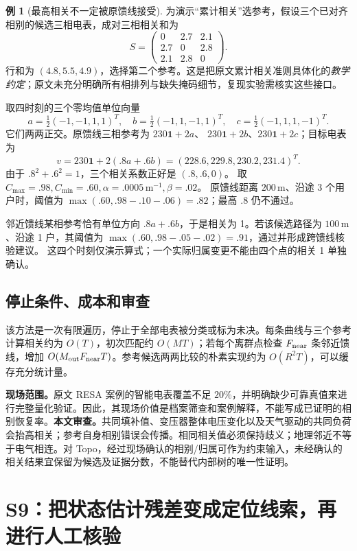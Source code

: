 \documentclass[UTF8,11pt,fontset=fandol,openany,oneside]{ctexbook}
\theoremstyle{definition}
\newtheorem{example}[theorem]{例}
\theoremstyle{remark}
\numberwithin{equation}{chapter}
\begin{document}
\begin{example}[最高相关不一定被原馈线接受]
为演示“累计相关”选参考，假设三个已对齐相别的候选三相电表，成对三相相关和为
\[
 S=\begin{pmatrix}0&2.7&2.1\\2.7&0&2.8\\2.1&2.8&0\end{pmatrix}.
\]
行和为 $(4.8,5.5,4.9)$，选择第二个参考。这是把原文累计相关准则具体化的\emph{教学约定}；原文未充分明确所有相排列与缺失掩码细节，复现实验需核实这些接口。

取四时刻的三个零均值单位向量
\[
 a=\tfrac12(-1,-1,1,1)^T,\quad
 b=\tfrac12(-1,1,-1,1)^T,\quad
 c=\tfrac12(-1,1,1,-1)^T.
\]
它们两两正交。原馈线三相参考为 $230\boldsymbol1+2a$、
$230\boldsymbol1+2b$、$230\boldsymbol1+2c$；目标电表为
\[
 v=230\boldsymbol1+2(.8a+.6b)=(228.6,229.8,230.2,231.4)^T.
\]
由于 $.8^2+.6^2=1$，三个相关系数正好是 $(.8,.6,0)$。
取 $C_{\max}=.98,C_{\min}=.60,\alpha=.0005\,\mathrm{m}^{-1},\beta=.02$。
原馈线距离 $200\,\mathrm m$、沿途 3 个用户时，阈值为
$\max(.60,.98-.10-.06)=.82$；最高 $.8$ 仍不通过。

邻近馈线某相参考恰有单位方向 $.8a+.6b$，于是相关为 1。若该候选路径为 $100\,\mathrm m$、沿途 1 户，其阈值为
$\max(.60,.98-.05-.02)=.91$，通过并形成跨馈线核验建议。
这四个时刻仅演示算式；一个实际归属变更不能由四个点的相关 1 单独确认。
\end{example}

\subsection{停止条件、成本和审查}

该方法是一次有限遍历，停止于全部电表被分类或标为未决。每条曲线与三个参考计算相关约为 $O(T)$，初次匹配约 $O(MT)$；若每个离群点检查 $F_{\rm near}$ 条邻近馈线，增加 $O(M_{\rm out}F_{\rm near}T)$。参考候选两两比较的朴素实现约为 $O(R^2T)$，可以缓存充分统计量。

\textbf{现场范围。}原文 RESA 案例的智能电表覆盖不足 $20\%$，并明确缺少可靠真值来进行完整量化验证。因此，其现场价值是档案筛查和案例解释，不能写成已证明的相别恢复率。\textbf{本文审查。}共同填补值、变压器整体电压变化以及天气驱动的共同负荷会抬高相关；参考自身相别错误会传播。相同相关值必须保持歧义；地理邻近不等于电气相连。对 Topo，经过现场确认的相别/归属可作为约束输入，未经确认的相关结果宜保留为候选及证据分数，不能替代内部树的唯一性证明。

\section{S9：把状态估计残差变成定位线索，再进行人工核验}
\label{sec:dq_s9}
\end{document}
